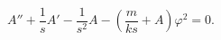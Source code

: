 \begin{equation}\label{eq3}
A'' + \frac{1}{s}A' - \frac{1}{s^2}A 
- \left( \frac{m}{ks} + A\right)\varphi^2=0.
\end{equation}

